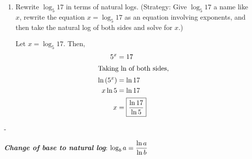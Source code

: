 \documentclass{article}
\makeatletter
\newlength{\tipmargin}
\renewenvironment{framed}{
  \setlength{\tipmargin}{\textwidth-\linewidth}
  \advance\@totalleftmargin-\tipmargin
  \def\FrameCommand{\hspace{\tipmargin}\fbox}%
  \advance\linewidth\tipmargin
  \MakeFramed {\advance\hsize-\width \FrameRestore}%
}
{\endMakeFramed}
\makeatother
\begin{document}
\begin{enumerate}[resume]
  \begin{solution}
    \begin{center}
    \end{center}
    All of the graphs have an $x$-intercept at $(1,0)$, and they
    all have a vertical asymptote of $x=0$.
  \end{solution}

\item  \label{log-base-b-in-terms-of-ln-example}

  \begin{problem}[\vfill]
    Rewrite $\log_5 17$ in terms of natural logs.  (Strategy: Give $\log_5
    17$ a name like $x$, rewrite the equation $x = \log_5 17$ as an
    equation involving exponents, and then take the natural log of both
    sides and solve for $x$.)
  \end{problem}

  \begin{solution}
    Let $x = \log_5 17$. Then,
    \begin{align*}
      5^x &= 17 \\
      \intertext{Taking ln of both sides,}
      \ln \left( 5^x \right) &= \ln 17 \\
      x \ln 5 &= \ln 17 \\
      x &= \boxed{\frac{\ln 17}{\ln 5}}
    \end{align*}
  \end{solution}

\end{enumerate}
\begin{framed}  
  \emph{\bf Change of base to natural log}: $\log_b a = \dfrac{\ln a}{\ln b}$
\end{framed}
\end{document}
